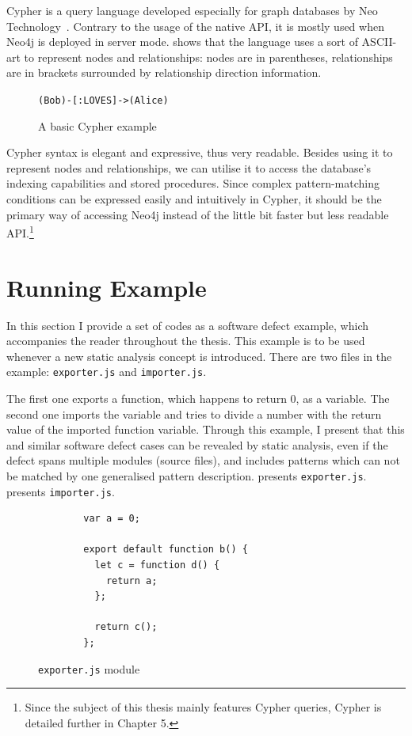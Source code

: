 Cypher is a query language developed especially for graph databases by Neo Technology~\cite{neo4j-cypher}. Contrary to the usage of the native API, it is mostly used when Neo4j is deployed in server mode.  shows that the language uses a sort of ASCII-art to represent nodes and relationships: nodes are in parentheses, relationships are in brackets surrounded by relationship direction information.

\begin{figure}[!htb]
	\centering
	\texttt{(Bob)-[:LOVES]->(Alice)}
  \caption{A basic Cypher example}
	\label{fig:cypher-intro}
\end{figure}

Cypher syntax is elegant and expressive, thus very readable. Besides using it to represent nodes and relationships, we can utilise it to access the database's indexing capabilities and stored procedures. Since complex pattern-matching conditions can be expressed easily and intuitively in Cypher, it should be the primary way of accessing Neo4j instead of the little bit faster but less readable API.\footnote{Since the subject of this thesis mainly features Cypher queries, Cypher is detailed further in Chapter 5.}


\section{Running Example}

In this section I provide a set of \es codes as a software defect example, which accompanies the reader throughout the thesis. This example is to be used whenever a new static analysis concept is introduced. There are two files in the example: \texttt{exporter.js} and \texttt{importer.js}.

The first one exports a function, which happens to return $0$, as a variable. The second one imports the variable and tries to divide a number with the return value of the imported function variable. Through this example, I present that this and similar software defect cases can be revealed by static analysis, even if the defect spans multiple \es modules (source files), and includes patterns which can not be matched by one generalised pattern description.  presents \texttt{exporter.js}.  presents \texttt{importer.js}.

\vspace{2em}
\begin{figure}[!htb]
	\centering
	\begin{minipage}{25em}
		\begin{verbatim}
		var a = 0;

		export default function b() {
		  let c = function d() {
		    return a;
		  };

		  return c();
		};
		\end{verbatim}
	\end{minipage}
  \caption{\texttt{exporter.js} module}
  \label{fig:running-example-exporter}
\end{figure}

